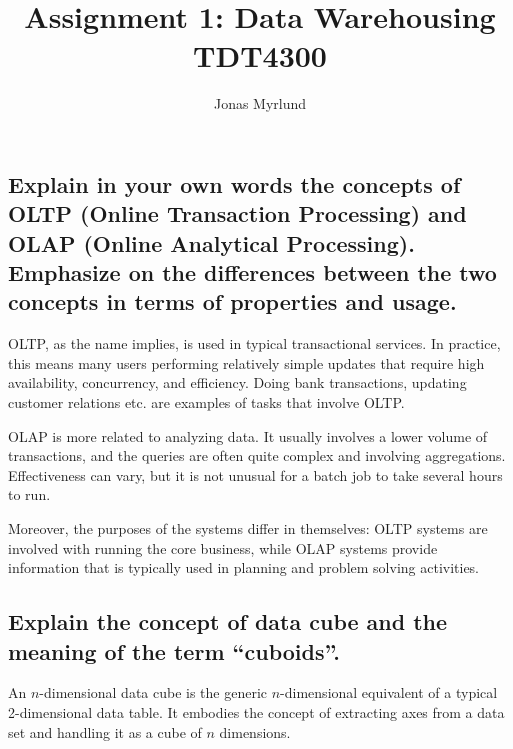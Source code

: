 \documentclass[11pt,a4paper]{article}
\begin{document}
\title{Assignment 1: Data Warehousing \\ \large{TDT4300}}
\author{Jonas Myrlund}

\maketitle

\section{}

\subsection{Explain in your own words the concepts of OLTP (Online Transaction Processing) and OLAP (Online Analytical Processing). Emphasize on the differences between the two concepts in terms of properties and usage.}

OLTP, as the name implies, is used in typical transactional services. In practice, this means many users performing relatively simple updates that require high availability, concurrency, and efficiency. Doing bank transactions, updating customer relations etc. are examples of tasks that involve OLTP.

OLAP is more related to analyzing data. It usually involves a lower volume of transactions, and the queries are often quite complex and involving aggregations. Effectiveness can vary, but it is not unusual for a batch job to take several hours to run.

Moreover, the purposes of the systems differ in themselves: OLTP systems are involved with running the core business, while OLAP systems provide information that is typically used in planning and problem solving activities.


\subsection{Explain the concept of data cube and the meaning of the term ``cuboids''.}

An $n$-dimensional data cube is the generic $n$-dimensional equivalent of a typical 2-dimensional data table. It embodies the concept of extracting axes from a data set and handling it as a cube of $n$ dimensions.
\end{document}
